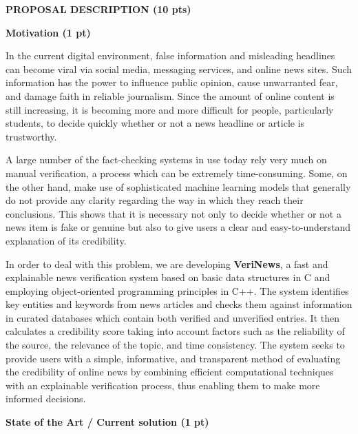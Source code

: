 \documentclass[10pt,a4paper]{article}
\newcommand{\bluebigheading}[1]{%
    {\bfseries\color{TitleBlue}\fontsize{13}{15}\selectfont #1}\par
}
\newcommand{\blueheading}[1]{%
    \vspace{2.5mm}%
    {\bfseries\color{TitleBlue}\fontsize{11}{13}\selectfont #1}\par
}
\begin{document}
\newpage

\bluebigheading{PROPOSAL DESCRIPTION (10 pts)}
\vspace{5mm}
\blueheading{Motivation (1 pt)}

\begin{dynamicanswerbox}
In the current digital environment, false information and misleading headlines can become viral via social media, messaging services, and online news sites. Such information has the power to influence public opinion, cause unwarranted fear, and damage faith in reliable journalism. Since the amount of online content is still increasing, it is becoming more and more difficult for people, particularly students, to decide quickly whether or not a news headline or article is trustworthy.

A large number of the fact-checking systems in use today rely very much on manual verification, a process which can be extremely time-consuming. Some, on the other hand, make use of sophisticated machine learning models that generally do not provide any clarity regarding the way in which they reach their conclusions. This shows that it is necessary not only to decide whether or not a news item is fake or genuine but also to give users a clear and easy-to-understand explanation of its credibility.

In order to deal with this problem, we are developing \textbf{VeriNews}, a fast and explainable news verification system based on basic data structures in C and employing object-oriented programming principles in C++. The system identifies key entities and keywords from news articles and checks them against information in curated databases which contain both verified and unverified entries. It then calculates a credibility score taking into account factors such as the reliability of the source, the relevance of the topic, and time consistency. The system seeks to provide users with a simple, informative, and transparent method of evaluating the credibility of online news by combining efficient computational techniques with an explainable verification process, thus enabling them to make more informed decisions.
\end{dynamicanswerbox}
\vspace{10mm}
\blueheading{State of the Art / Current solution (1 pt)}
\end{document}
